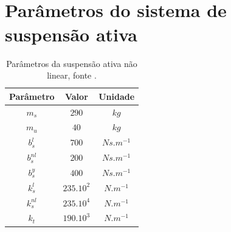 \section{\\Parâmetros do sistema de suspensão ativa}
\begin{table}[h!]
\centering
    \begin{tabular}{|c|c|c|}
        \hline
        Parâmetro & Valor & Unidade\\
        \hline
        \hline
        $m_s$& $290$& $kg$\\
        $m_u$& $40$& $kg$\\
        $b^{l}_s$& $700$& $Ns.m^{-1}$\\
        $b^{nl}_s$& $200$& $Ns.m^{-1}$\\
        $b^{y}_s$& $400$& $Ns.m^{-1}$\\
        $k^{l}_s$& $235.10^2$& $N.m^{-1}$\\
        $k^{nl}_s$& $235.10^4$& $N.m^{-1}$\\
        $k_t$& $190.10^3$& $N.m^{-1}$\\
        \hline
    \end{tabular}    \label{tb:parametros}\caption{Parâmetros da suspensão ativa não linear, fonte \cite{MarceloTusset2008MINISTERIOPor}.}
\end{table}
